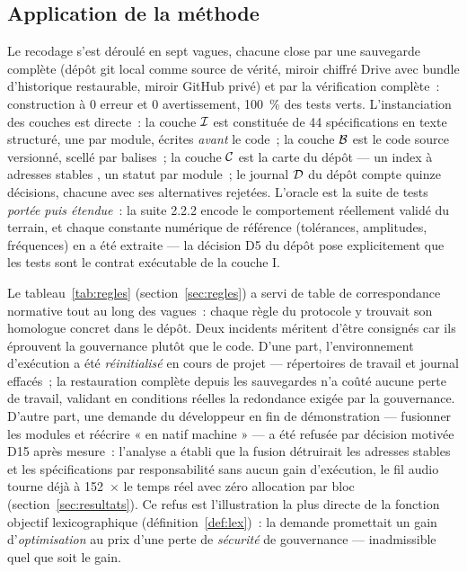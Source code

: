 \subsection{Application de la méthode}\label{sec:application}

Le recodage s’est déroulé en sept vagues, chacune close par une sauvegarde
complète (dépôt git local comme source de vérité, miroir chiffré Drive avec
bundle d’historique restaurable, miroir GitHub privé) et par la vérification
complète~: construction à 0 erreur et 0 avertissement, 100~\% des tests
verts. L’instanciation des couches est directe~: la couche $\mathcal{I}$ est
constituée de 44 spécifications en texte structuré, une par module, écrites
\emph{avant} le code~; la couche $\mathcal{B}$ est le code source versionné, scellé
par balises~; la couche $\mathcal{C}$ est la carte du dépôt — un index à adresses
stables , un statut par module~; le journal $\mathcal{D}$ du dépôt
compte quinze décisions, chacune avec ses alternatives rejetées. L’oracle
est la suite de tests \emph{portée puis étendue}~: la suite 2.2.2 encode le
comportement réellement validé du terrain, et chaque constante numérique de
référence (tolérances, amplitudes, fréquences) en a été extraite — la
décision D5 du dépôt pose explicitement que les tests sont le contrat
exécutable de la couche I.

Le tableau~\ref{tab:regles} (section~\ref{sec:regles}) a servi de table de
correspondance normative tout au long des vagues~: chaque règle du
protocole y trouvait son homologue concret dans le dépôt. Deux incidents
méritent d’être consignés car ils éprouvent la gouvernance plutôt que le
code. D’une part, l’environnement d’exécution a été \emph{réinitialisé} en
cours de projet — répertoires de travail et journal effacés~; la
restauration complète depuis les sauvegardes n’a coûté aucune perte de
travail, validant en conditions réelles la redondance exigée par la
gouvernance. D’autre part, une demande du développeur en fin de
démonstration — fusionner les modules et réécrire « en natif machine » —
a été refusée par décision motivée D15 après mesure~: l’analyse a établi
que la fusion détruirait les adresses stables et les spécifications par
responsabilité sans aucun gain d’exécution, le fil audio tourne déjà à
152~$\times$ le temps réel avec zéro allocation par bloc
(section~\ref{sec:resultats}). Ce refus est l’illustration la plus directe
de la fonction objectif lexicographique (définition~\ref{def:lex})~: la
demande promettait un gain d’\emph{optimisation} au prix d’une perte de
\emph{sécurité} de gouvernance — inadmissible quel que soit le gain.

